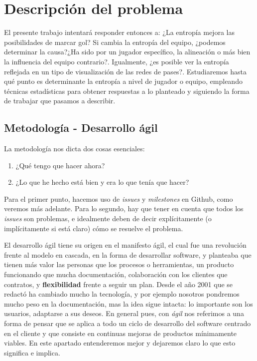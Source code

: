\chapter{Descripción del problema}
\label{chap:descripcion}

El presente trabajo intentará responder entonces a: ¿La entropía mejora las
posibilidades de marcar gol? Si cambia la entropía del equipo, ¿podemos
determinar la causa?¿Ha sido por un jugador específico, la alineación o más bien
la influencia del equipo contrario?. Igualmente, ¿es posible ver la entropía
reflejada en un tipo de visualización de las redes de pases?. Estudiaremos hasta
qué punto es determinante la entropía a nivel de jugador o equipo, empleando
técnicas estadísticas para obtener respuestas a lo planteado y siguiendo la
forma de trabajar que pasamos a describir.

\section{Metodología - Desarrollo ágil} \label{ch:metod}
La metodología nos dicta dos cosas esenciales:
\begin{enumerate}
    \item ¿Qué tengo que hacer ahora?
    \item ¿Lo que he hecho está bien y era lo que tenía que hacer?
\end{enumerate}

Para el primer punto, hacemos uso de \textit{issues} y \textit{milestones} en Github, 
como veremos más adelante. Para lo segundo, hay que tener en cuenta que todos 
los \textit{issues} son problemas, e idealmente deben de decir explícitamente 
(o implícitamente si está claro) cómo se resuelve el problema.

El desarrollo ágil tiene su origen en el manifesto ágil\cite{manifiesto-agil},
el cual fue una revolución frente al modelo en cascada, en la forma de
desarrollar software, y planteaba que tienen más valor las personas que los
procesos o herramientas, un producto funcionando que mucha documentación,
colaboración con los clientes que contratos, y \textbf{flexibilidad} frente a
seguir un plan. Desde el año 2001 que se redactó ha cambiado mucho la
tecnología, y por ejemplo nosotros pondremos mucho peso en la documentación, mas
la idea sigue intacta: lo importante son los usuarios, adaptarse a sus
deseos. En general pues, con \textit{ágil} nos referimos a una forma de pensar
que se aplica a todo un ciclo de desarrollo del software centrado en el cliente
y que consiste en continuas mejoras de productos mínimamente
viables\cite{agile-science}.  En este apartado entenderemos mejor y dejaremos
claro lo que esto significa e implica.

